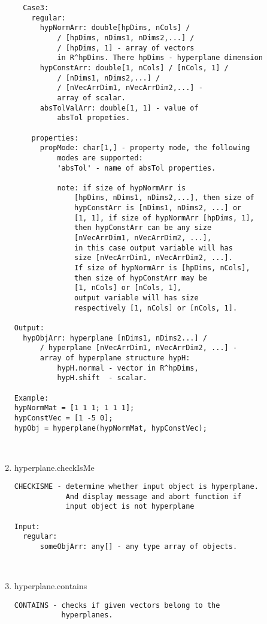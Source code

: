 \begin{enumerate}
\begin{lstlisting}
  Case3:
    regular:
      hypNormArr: double[hpDims, nCols] /
          / [hpDims, nDims1, nDims2,...] /
          / [hpDims, 1] - array of vectors
          in R^hpDims. There hpDims - hyperplane dimension
      hypConstArr: double[1, nCols] / [nCols, 1] /
          / [nDims1, nDims2,...] /
          / [nVecArrDim1, nVecArrDim2,...] -
          array of scalar.
      absTolValArr: double[1, 1] - value of
          absTol propeties.

    properties:
      propMode: char[1,] - property mode, the following
          modes are supported:
          'absTol' - name of absTol properties.

          note: if size of hypNormArr is
              [hpDims, nDims1, nDims2,...], then size of
              hypConstArr is [nDims1, nDims2, ...] or
              [1, 1], if size of hypNormArr [hpDims, 1],
              then hypConstArr can be any size
              [nVecArrDim1, nVecArrDim2, ...],
              in this case output variable will has
              size [nVecArrDim1, nVecArrDim2, ...].
              If size of hypNormArr is [hpDims, nCols],
              then size of hypConstArr may be
              [1, nCols] or [nCols, 1],
              output variable will has size
              respectively [1, nCols] or [nCols, 1].

Output:
  hypObjArr: hyperplane [nDims1, nDims2...] /
      / hyperplane [nVecArrDim1, nVecArrDim2, ...] -
      array of hyperplane structure hypH:
          hypH.normal - vector in R^hpDims,
          hypH.shift  - scalar.

Example:
hypNormMat = [1 1 1; 1 1 1];
hypConstVec = [1 -5 0];
hypObj = hyperplane(hypNormMat, hypConstVec);



\end{lstlisting}
\fontfamily{\familydefault}
\selectfont
\item {hyperplane.checkIsMe}
\selectfont
\begin{lstlisting}
CHECKISME - determine whether input object is hyperplane.
            And display message and abort function if
            input object is not hyperplane

Input:
  regular:
      someObjArr: any[] - any type array of objects.



\end{lstlisting}
\fontfamily{\familydefault}
\selectfont
\item {hyperplane.contains}
\selectfont
\begin{lstlisting}
CONTAINS - checks if given vectors belong to the
           hyperplanes.


\end{lstlisting}
\end{enumerate}

